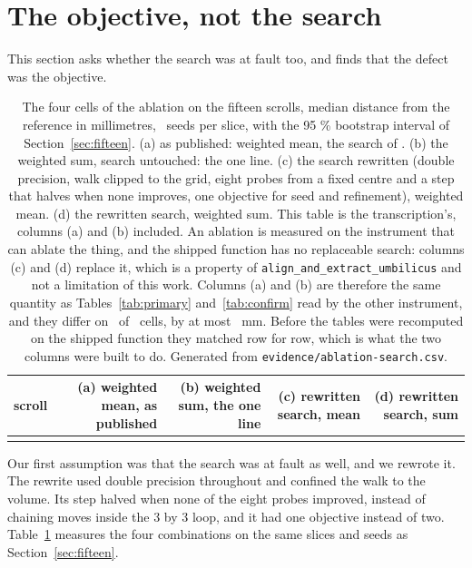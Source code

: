 \section{The objective, not the search}
\label{sec:ablation}
This section asks whether the search was at fault too, and finds that the defect was the objective.

\begin{table}[t]
\caption{The four cells of the ablation on the fifteen scrolls, median distance from the
reference in millimetres, \RevKSeeds\ seeds per slice, with the 95 \% bootstrap interval of
Section~\ref{sec:fifteen}. (a) as published: weighted mean, the search of . (b) the
weighted sum, search untouched: the one line. (c) the search rewritten (double precision, walk
clipped to the grid, eight probes from a fixed centre and a step that halves when none improves,
one objective for seed and refinement), weighted mean. (d) the rewritten search, weighted sum.
This table is the transcription's, columns (a) and (b) included. An ablation is measured on the
instrument that can ablate the thing, and the shipped function has no replaceable search: columns
(c) and (d) replace it, which is a property of \texttt{align\_and\_extract\_umbilicus} and not a
limitation of this work. Columns (a) and (b) are therefore the same
quantity as Tables~\ref{tab:primary} and~\ref{tab:confirm} read by the other instrument, and they
differ on \RevAblControlRowsMoved\ of \RevAblControlRowsOf\ cells, by at most
\RevAblControlWorstMove~mm. Before the tables were recomputed on the shipped function they
matched row for row, which is what the two columns were built to do. Generated from
\texttt{evidence/ablation-search.csv}.}
\label{tab:ablation}
\centering
\footnotesize
\setlength{\tabcolsep}{4pt}
\begin{tabular}{@{}lrrrr@{}}
\toprule
scroll & (a) weighted mean, as published & (b) weighted sum, the one line & (c) rewritten search, mean & (d) rewritten search, sum \\
\midrule
{}{rev1-ablation}
\bottomrule
\end{tabular}
\end{table}

Our first assumption was that the search was at fault as well, and we rewrote it. The rewrite
used double precision throughout and confined the walk to the volume. Its step halved when none of
the eight probes improved, instead of chaining moves inside the 3 by 3 loop, and it had one
objective instead of two. Table~\ref{tab:ablation} measures the four combinations on the same
slices and seeds as Section~\ref{sec:fifteen}.

